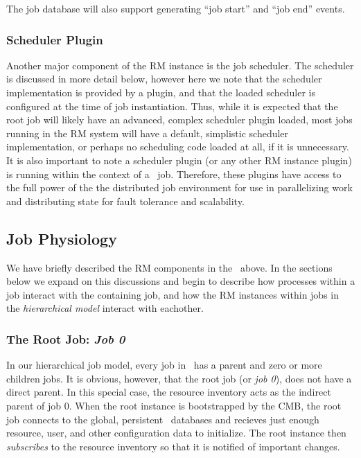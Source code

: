 The job database will also support generating ``job start'' and ``job end''
events.
\ifcomments
{} \fi

\subsubsection{Scheduler Plugin}

Another major component of the RM instance is the job scheduler.
The scheduler is discussed in more detail below, however here we
note that the scheduler implementation is provided by a plugin,
and that the loaded scheduler is configured at the time of job
instantiation. Thus, while it is expected that the root job will
likely have an advanced, complex scheduler plugin loaded, most jobs
running in the RM system will have a default, simplistic scheduler
implementation, or perhaps no scheduling code loaded at all, if
it is unnecessary. It is also important to note a scheduler plugin
(or any other RM instance plugin) is running within the context of a
\ngrm\ job. Therefore, these plugins have access to the full power
of the the distributed job environment for use in parallelizing
work and distributing state for fault tolerance and scalability.

\subsection{Job Physiology}

We have briefly described the RM components in the \ngrm\ above.
In the sections below we expand on this discussions and begin
to describe how processes within a job interact with the containing
job, and how the RM instances within jobs in the \emph{hierarchical model}
interact with eachother.

\subsubsection{The Root Job: \emph{Job 0}}

In our hierarchical job model, every job in \ngrm\ has a parent
and zero or more children jobs. It is obvious, however, that
the root job (or \emph{job 0}), does not have a direct parent.
In this special case, the resource inventory acts as the
indirect parent of job 0. When the root instance is bootstrapped
by the CMB, the root job connects to the global, persistent
\ngrm\ databases and recieves just enough resource, user, and other
configuration data to initialize. The root instance then
\emph{subscribes} to the resource inventory so that it is
notified of important changes.
\ifcomments
{}
\fi

